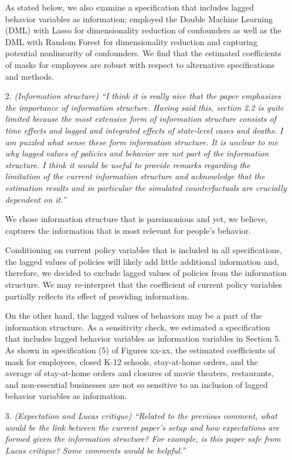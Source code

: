 \documentclass[11pt]{article}
\begin{document}
\begin{itemize}
As stated below, we also examine a specification that includes lagged behavior variables as information; employed the Double Machine Learning (DML) with Lasso for dimensionality reduction of confounders as well as the DML with Random Forest for dimensionality reduction and capturing potential nonlinearity of confounders. We find that the estimated coefficients of masks for employees are robust with respect to alternative specifications and methods.
  
  
\item[2. ]  \textit{(Information structure) ``I think it is really nice that the paper emphasizes the importance of
information structure. Having said this, section 2.2 is quite limited because the most extensive
form of information structure consists of time effects and lagged and integrated effects
of state-level cases and deaths. I am puzzled what sense these form information structure. It
is unclear to me why lagged values of policies and behavior are not part of the information 
structure. I think it would be useful to provide remarks regarding the limitation of the current
information structure and acknowledge that the estimation results and in particular the
simulated counterfactuals are crucially dependent on it.''}
  
We chose information structure that is parsimonious and yet, we believe, captures the  information that is most relevant for people's behavior. 

Conditioning on current policy variables that is included in all specifications, the lagged values of policies will  likely add little additional information and, therefore, we decided to exclude lagged values of policies from the information structure. We may re-interpret that the coefficient of current policy variables partially reflects its effect of providing information. 

On the other hand, the lagged values of  behaviors may be a part of the information structure. As a sensitivity check, we estimated a specification that includes  lagged behavior variables as information variables in Section 5.  As shown in specification (5) of Figures xx-xx, the estimated coefficients of mask for employees, closed K-12 schools, stay-at-home orders, and the average of stay-at-home orders and closures of movie theaters, restaurants, and non-essential businesses are not so sensitive to an inclusion of lagged behavior variables as information.
   
  
\item[3.]  \textit{(Expectation and Lucas critique) ``Related to the previous comment, what would be the link
between the current paper’s setup and how expectations are formed given the information
structure? For example, is this paper safe from Lucas critique? Some comments would be
helpful.''}


\end{itemize}
\end{document}
